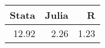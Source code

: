 
\begin{tabular}{rrr}
\toprule
Stata & Julia & R\\
\midrule
12.92 & 2.26 & 1.23\\
\bottomrule
\end{tabular}
